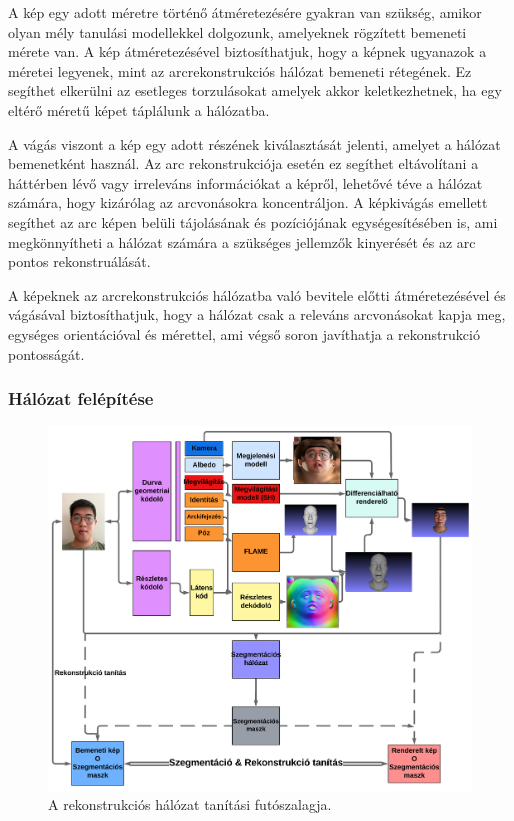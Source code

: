\documentclass[12pt,a4]{article}
\begin{document}
            A kép egy adott méretre történő átméretezésére gyakran van szükség, amikor olyan mély tanulási modellekkel dolgozunk, amelyeknek rögzített bemeneti mérete van. A kép átméretezésével biztosíthatjuk, hogy a képnek ugyanazok a méretei legyenek, mint az arcrekonstrukciós hálózat bemeneti rétegének. Ez segíthet elkerülni az esetleges torzulásokat amelyek akkor keletkezhetnek, ha egy eltérő méretű képet táplálunk a hálózatba.

            A vágás viszont a kép egy adott részének kiválasztását jelenti, amelyet a hálózat bemenetként használ. Az arc rekonstrukciója esetén ez segíthet eltávolítani a háttérben lévő vagy irreleváns információkat a képről, lehetővé téve a hálózat számára, hogy kizárólag az arcvonásokra koncentráljon. A képkivágás emellett segíthet az arc képen belüli tájolásának és pozíciójának egységesítésében is, ami megkönnyítheti a hálózat számára a szükséges jellemzők kinyerését és az arc pontos rekonstruálását.

            A képeknek az arcrekonstrukciós hálózatba való bevitele előtti átméretezésével és vágásával biztosíthatjuk, hogy a hálózat csak a releváns arcvonásokat kapja meg, egységes orientációval és mérettel, ami végső soron javíthatja a rekonstrukció pontosságát.
            
            
            \subsubsection{Hálózat felépítése}

            \begin{figure}[h!]	
        		\centering
        		\includegraphics[width=1\linewidth]{pipelinehun}
        		\caption{  A rekonstrukciós hálózat tanítási futószalagja.}
                \label{fig:pipeline}
        	\end{figure}
\end{document}
